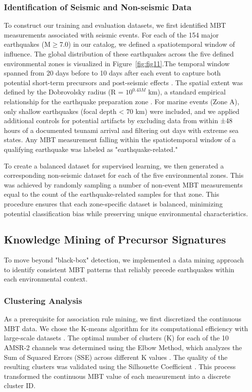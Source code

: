 \documentclass[preprint,review,12pt,authoryear]{elsarticle}
\begin{document}
\subsubsection{Identification of Seismic and Non-seismic Data}\label{sec:data_identification}
To construct our training and evaluation datasets, we first identified MBT measurements associated with seismic events. For each of the 154 major earthquakes (M$\ge$7.0) in our catalog, we defined a spatiotemporal window of influence. The global distribution of these earthquakes across the five defined environmental zones is visualized in Figure~\ref{fig:fig11}.The temporal window spanned from 20 days before to 10 days after each event to capture both potential short-term precursors and post-seismic effects \citep{akhoondzadehMultiPrecursorsAnalysis2018,qiSpatiotemporallyWeightedTwostep2020}. The spatial extent was defined by the Dobrovolsky radius (R = $10^{0.43M}$ km), a standard empirical relationship for the earthquake preparation zone \citep{dobrovolskyEstimationSizeEarthquake1979}. For marine events (Zone A), only shallow earthquakes (focal depth < 70 km) were included, and we applied additional controls for potential artifacts by excluding data from within ±48 hours of a documented tsunami arrival and filtering out days with extreme sea states. Any MBT measurement falling within the spatiotemporal window of a qualifying earthquake was labeled as "earthquake-related."

To create a balanced dataset for supervised learning, we then generated a corresponding non-seismic dataset for each of the five environmental zones. This was achieved by randomly sampling a number of non-event MBT measurements equal to the count of the earthquake-related samples for that zone. This procedure ensures that each zone-specific dataset is balanced, minimizing potential classification bias while preserving unique environmental characteristics.

\subsection{Knowledge Mining of Precursor Signatures}\label{sec:knowledge_mining}
To move beyond "black-box" detection, we implemented a data mining approach to identify consistent MBT patterns that reliably precede earthquakes within each environmental context.

\subsubsection{Clustering Analysis}\label{sec:clustering}
As a prerequisite for association rule mining, we first discretized the continuous MBT data. We chose the K-means algorithm for its computational efficiency with large-scale datasets \citep{hanConceptsTechniques2006}. The optimal number of clusters (K) for each of the 10 AMSR-2 channels was determined using the Elbow Method, which analyzes the Sum of Squared Errors (SSE) across different K values \citep{thorndikeWhoBelongsFamily1953}. The quality of the resulting clusters was validated using the Silhouette Coefficient \citep{rousseeuwSilhouettesGraphicalAid1987}. This process transformed the continuous MBT value of each measurement into a discrete cluster ID.
\end{document}
